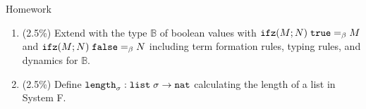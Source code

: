 \begin{frame}{Homework}
  \begin{enumerate}
    \item (2.5\%) Extend {\PCF} with the type $\mathbb{B}$ of boolean values with
      $\mathtt{ifz}(M; N)\;\mathtt{true} =_\beta M$ and $\mathtt{ifz}(M; N)\;\mathtt{false}
      =_\beta N$ including term formation rules, typing rules, and dynamics for
      $\mathbb{B}$.

%

    \item (2.5\%) Define $\mathtt{length}_\sigma : \mathtt{list}\;\sigma \to \mathtt{nat}$ calculating the length of a list in System F.
    
  \end{enumerate}
  
\end{frame}

%
% 


